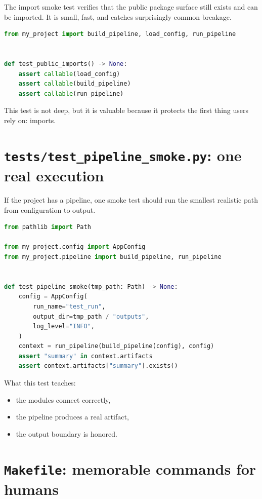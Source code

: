 \documentclass[11pt,oneside]{book}
\begin{document}
The import smoke test verifies that the public package surface still exists and can be imported.  
It is small, fast, and catches surprisingly common breakage.

\begin{lstlisting}[style=bookcode,language=Python]
from my_project import build_pipeline, load_config, run_pipeline


def test_public_imports() -> None:
    assert callable(load_config)
    assert callable(build_pipeline)
    assert callable(run_pipeline)
\end{lstlisting}

This test is not deep, but it is valuable because it protects the first thing users rely on: imports.

\section*{\texttt{tests/test\_pipeline\_smoke.py}: one real execution}

If the project has a pipeline, one smoke test should run the smallest realistic path from configuration to output.

\begin{lstlisting}[style=bookcode,language=Python]
from pathlib import Path

from my_project.config import AppConfig
from my_project.pipeline import build_pipeline, run_pipeline


def test_pipeline_smoke(tmp_path: Path) -> None:
    config = AppConfig(
        run_name="test_run",
        output_dir=tmp_path / "outputs",
        log_level="INFO",
    )
    context = run_pipeline(build_pipeline(config), config)
    assert "summary" in context.artifacts
    assert context.artifacts["summary"].exists()
\end{lstlisting}

What this test teaches:
\begin{itemize}
  \item the modules connect correctly,
  \item the pipeline produces a real artifact,
  \item the output boundary is honored.
\end{itemize}

\section*{\texttt{Makefile}: memorable commands for humans}
\end{document}
